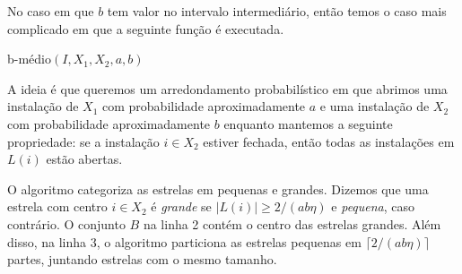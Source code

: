 No caso em que $b$ tem valor no intervalo intermediário, então temos o caso mais complicado em que a seguinte função é executada.
\begin{algorithm}
    \caption{\sc b-médio$(I,X_1,X_2,a,b)$}
\end{algorithm}

A ideia é que queremos um arredondamento probabilístico em que abrimos uma instalação de $X_1$ com probabilidade aproximadamente $a$ e uma instalação de $X_2$ com probabilidade aproximadamente $b$ enquanto mantemos a seguinte propriedade: se a instalação $i \in X_2$ estiver fechada, então todas as instalações em $L(i)$ estão abertas.

O algoritmo categoriza as estrelas em pequenas e grandes. Dizemos que uma estrela com centro $i \in X_2$ é \emph{grande} se $|L(i)| /(ab\eta)$ e \emph{pequena}, caso contrário. O conjunto $B$ na linha 2 contém o centro das estrelas grandes. Além disso, na linha 3, o algoritmo particiona as estrelas pequenas em $/(ab\eta)\rceil$ partes, juntando estrelas com o mesmo tamanho.

